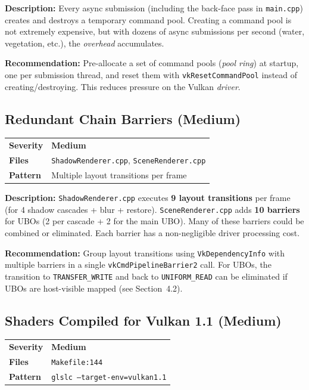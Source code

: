 \documentclass[a4paper,10pt]{article}
\newcommand{\severity}[1]{%
  \ifstrequal{#1}{Critical}{\textcolor{high}{\textbf{#1}}}{%
  \ifstrequal{#1}{High}{\textcolor{high}{\textbf{#1}}}{%
  \ifstrequal{#1}{Medium}{\textcolor{medium}{\textbf{#1}}}{%
  \ifstrequal{#1}{Low}{\textcolor{low}{\textbf{#1}}}{#1}}}}}
\begin{document}
\vspace{0.5em}
\noindent
\textbf{Description:} Every async submission (including the back-face pass
in \texttt{main.cpp}) creates and destroys a temporary command pool.
Creating a command pool is not extremely expensive, but with dozens of async
submissions per second (water, vegetation, etc.), the \textit{overhead}
accumulates.

\noindent\textbf{Recommendation:} Pre-allocate a set of command pools
(\textit{pool ring}) at startup, one per submission thread, and reset them
with \texttt{vkResetCommandPool} instead of creating/destroying. This reduces
pressure on the Vulkan \textit{driver}.

\subsection{Redundant Chain Barriers (Medium)}

\begin{tabular}{ll}
    \textbf{Severity} & \severity{Medium} \\
    \textbf{Files}     & \texttt{ShadowRenderer.cpp},
                          \texttt{SceneRenderer.cpp} \\
    \textbf{Pattern}   & Multiple layout transitions per frame
\end{tabular}

\vspace{0.5em}
\noindent
\textbf{Description:} \texttt{ShadowRenderer.cpp} executes \textbf{9 layout
transitions} per frame (for 4 shadow cascades + blur + restore). \texttt{SceneRenderer.cpp}
adds \textbf{10 barriers} for UBOs (2 per cascade + 2 for the main UBO). Many
of these barriers could be combined or eliminated. Each barrier has a
non-negligible driver processing cost.

\noindent\textbf{Recommendation:} Group layout transitions using
\texttt{VkDependencyInfo} with multiple barriers in a single
\texttt{vkCmdPipelineBarrier2} call. For UBOs, the transition to
\texttt{TRANSFER\_WRITE} and back to \texttt{UNIFORM\_READ} can be
eliminated if UBOs are host-visible mapped (see Section~4.2).

\subsection{Shaders Compiled for Vulkan 1.1 (Medium)}

\begin{tabular}{ll}
    \textbf{Severity} & \severity{Medium} \\
    \textbf{Files}     & \texttt{Makefile:144} \\
    \textbf{Pattern}   & \texttt{glslc --target-env=vulkan1.1} \\
\end{tabular}
\end{document}
